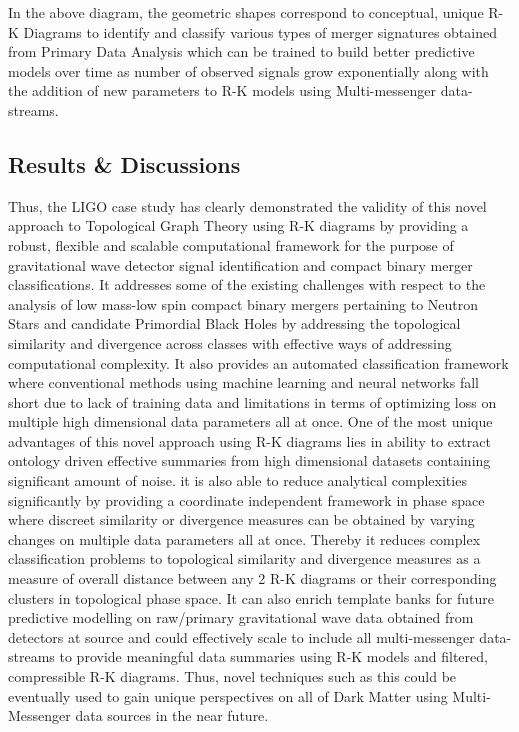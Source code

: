 In the above diagram, the geometric shapes correspond to conceptual, unique R-K Diagrams to identify and classify various types of merger signatures obtained from Primary Data Analysis which can be trained to build better predictive models over time as number of observed signals grow exponentially along with the addition of new parameters to R-K models using Multi-messenger data-streams. 


\subsection{Results \& Discussions}

Thus, the LIGO case study has clearly demonstrated the validity of this novel approach to Topological Graph Theory using R-K diagrams by providing a robust, flexible and scalable computational framework for the purpose of gravitational wave detector signal identification and compact binary merger classifications. It addresses some of the existing challenges with respect to the analysis of low mass-low spin compact binary mergers pertaining to Neutron Stars and candidate Primordial Black Holes by addressing the topological similarity and divergence across classes with effective ways of addressing computational complexity. It also provides an automated classification framework where conventional methods using machine learning and neural networks fall short due to lack of training data and limitations in terms of optimizing loss on multiple high dimensional data parameters all at once. One of the most unique advantages of this novel approach using R-K diagrams lies in ability to extract ontology driven effective summaries from high dimensional datasets containing significant amount of noise. it is also able to reduce analytical complexities significantly by providing a coordinate independent framework in phase space where discreet similarity or divergence measures can be obtained by varying changes on multiple data parameters all at once. Thereby it reduces complex classification problems to topological similarity and divergence measures as a measure of overall distance between any 2 R-K diagrams or their corresponding clusters in topological phase space. It can also enrich template banks for future predictive modelling on raw/primary gravitational wave data obtained from detectors at source and could effectively scale to include all multi-messenger data-streams to provide meaningful data summaries using R-K models and filtered, compressible R-K diagrams. Thus, novel techniques such as this could be eventually used to gain unique perspectives on all of Dark Matter using Multi-Messenger data sources in the near future.
